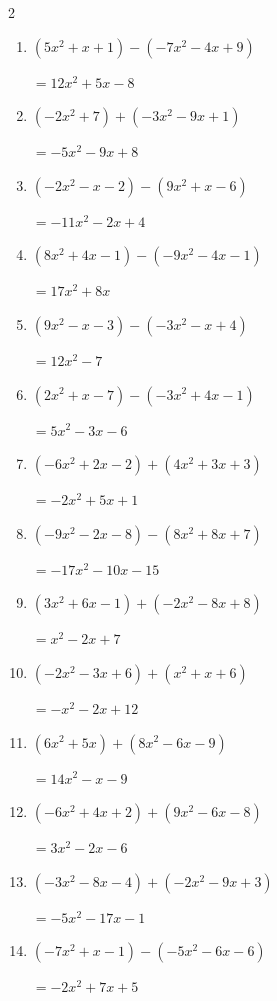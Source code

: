 \begin{multicols}{2}
\begin{enumerate}
  \item $(5x^{2}+x+1)-(-7x^{2}-4x+9)$

        $=12x^{2}+5x-8$

\columnbreak %

  \item $(-2x^{2}+7)+(-3x^{2}-9x+1)$

        $=-5x^{2}-9x+8$

  \item $(-2x^{2}-x-2)-(9x^{2}+x-6)$

        $=-11x^{2}-2x+4$

  \item $(8x^{2}+4x-1)-(-9x^{2}-4x-1)$

        $=17x^{2}+8x$

  \item $(9x^{2}-x-3)-(-3x^{2}-x+4)$

        $=12x^{2}-7$

  \item $(2x^{2}+x-7)-(-3x^{2}+4x-1)$

        $=5x^{2}-3x-6$

  \item $(-6x^{2}+2x-2)+(4x^{2}+3x+3)$

        $=-2x^{2}+5x+1$

  \item $(-9x^{2}-2x-8)-(8x^{2}+8x+7)$

        $=-17x^{2}-10x-15$

  \item $(3x^{2}+6x-1)+(-2x^{2}-8x+8)$

        $=x^{2}-2x+7$

  \item $(-2x^{2}-3x+6)+(x^{2}+x+6)$

        $=-x^{2}-2x+12$

  \item $(6x^{2}+5x)+(8x^{2}-6x-9)$

        $=14x^{2}-x-9$

  \item $(-6x^{2}+4x+2)+(9x^{2}-6x-8)$

        $=3x^{2}-2x-6$

  \item $(-3x^{2}-8x-4)+(-2x^{2}-9x+3)$

        $=-5x^{2}-17x-1$

  \item $(-7x^{2}+x-1)-(-5x^{2}-6x-6)$

        $=-2x^{2}+7x+5$


\end{enumerate}
\end{multicols}
